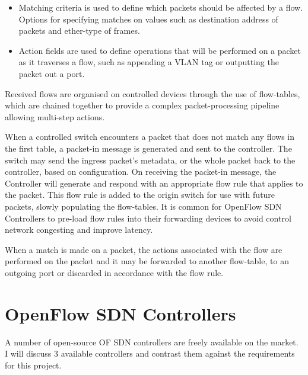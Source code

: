 \begin{itemize}
    \item Matching criteria is used to define which packets should be affected by a flow. Options for specifying matches on values such as destination address of packets and ether-type of frames.
    \item Action fields are used to define operations that will be performed on a packet as it traverses a flow, such as appending a VLAN tag or outputting the packet out a port.
\end{itemize}

Received flows are organised on controlled devices through the use of flow-tables, which are chained together to provide a complex packet-processing pipeline allowing multi-step actions.

When a controlled switch encounters a packet that does not match any flows in the first table, a packet-in message is generated and sent to the controller. The switch may send the ingress packet's metadata, or the whole packet back to the controller, based on configuration. 
On receiving the packet-in message, the Controller will generate and respond with an appropriate flow rule that applies to the packet. This flow rule is added to the origin switch for use with future packets, slowly populating the flow-tables. 
It is common for OpenFlow SDN Controllers\cite{faucet_read_the_docs} to pre-load flow rules into their forwarding devices to avoid control network congesting and improve latency. \cite{high_speed_open_flow}

When a match is made on a packet, the actions associated with the flow are performed on the packet and it may be forwarded to another flow-table, to an outgoing port or discarded in accordance with the flow rule.

\section{OpenFlow SDN Controllers}
A number of open-source OF SDN controllers are freely available on the market. I will discuss 3 available controllers and contrast them against the requirements for this project.

